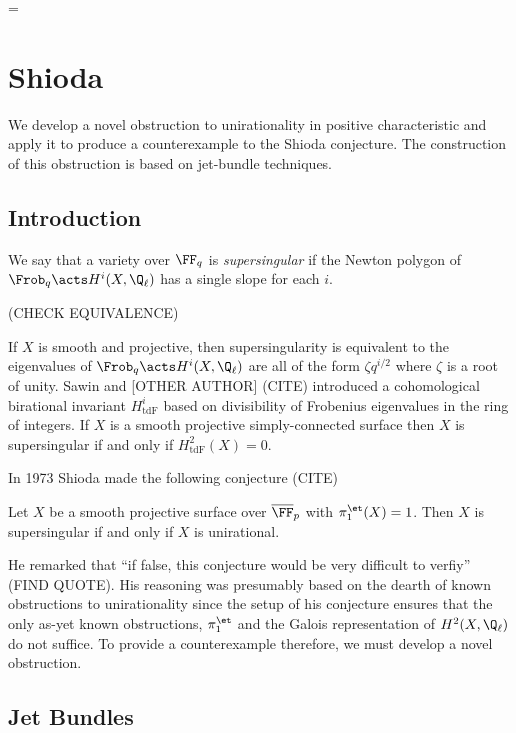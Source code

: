 =\documentclass[12pt]{article}
\begin{document}
\section{Shioda}

We develop a novel obstruction to unirationality in positive characteristic and apply it to produce a counterexample to the Shioda conjecture. The construction of this obstruction is based on jet-bundle techniques.

\subsection{Introduction}

We say that a variety over $\FF_q$ is \textit{supersingular} if the Newton polygon of $\Frob_q \acts H^i(X, \Q_\ell)$ has a single slope for each $i$. 

(CHECK EQUIVALENCE)

\newcommand{\tdF}{\mathrm{tdF}}

If $X$ is smooth and projective, then supersingularity is equivalent to the eigenvalues of $\Frob_q \acts H^i(X, \Q_\ell)$ are all of the form $\zeta q^{i/2}$ where $\zeta$ is a root of unity. Sawin and [OTHER AUTHOR] (CITE) introduced a cohomological birational invariant $H^i_{\tdF}$ based on divisibility of Frobenius eigenvalues in the ring of integers. If $X$ is a smooth projective simply-connected surface then $X$ is supersingular if and only if $H^2_{\tdF}(X) = 0$. 

In 1973 Shioda made the following conjecture (CITE)

\begin{conj}[Shioda]
Let $X$ be a smooth projective surface over $\overline{\FF}_p$ with $\pi_1^{\et}(X) = 1$. Then $X$ is supersingular if and only if $X$ is unirational.
\end{conj} 

He remarked that ``if false, this conjecture would be very difficult to verfiy'' (FIND QUOTE). His reasoning was presumably based on the dearth of known obstructions to unirationality since the setup of his conjecture ensures that the only as-yet known obstructions, $\pi_1^{\et}$ and the Galois representation of $H^2(X, \Q_\ell)$ do not suffice. To provide a counterexample therefore, we must develop a novel obstruction.

\subsection{Jet Bundles}
\end{document}

